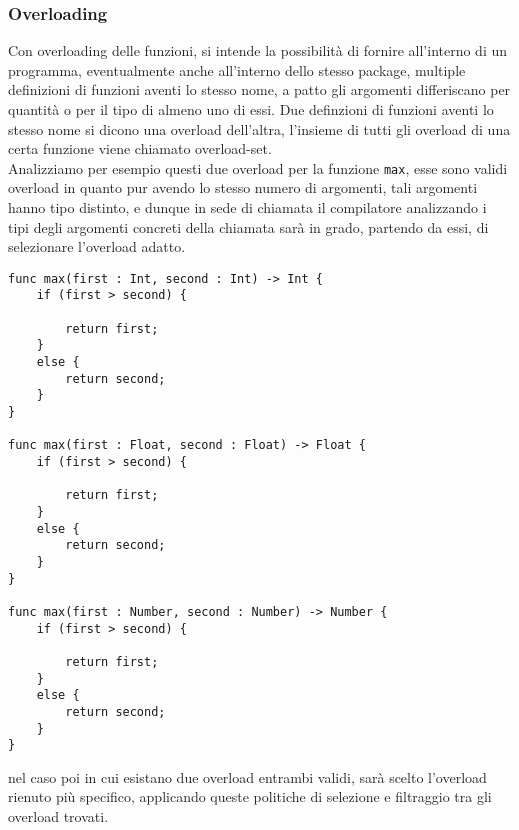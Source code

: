 \subsubsection{Overloading}
Con overloading delle funzioni, si intende la possibilità di fornire all’interno 
di un programma, eventualmente anche all’interno dello stesso package, multiple 
definizioni di funzioni aventi lo stesso nome, a patto gli argomenti differiscano 
per quantità o per il tipo di almeno uno di essi. Due definzioni di funzioni 
aventi lo stesso nome si dicono una overload dell’altra, l’insieme di tutti 
gli overload di una certa funzione viene chiamato overload-set. \\

Analizziamo per esempio questi due overload per la funzione \texttt{max}, esse sono 
validi overload in quanto pur avendo lo stesso numero di argomenti, tali 
argomenti hanno tipo distinto, e dunque in sede di chiamata il compilatore 
analizzando i tipi degli argomenti concreti della chiamata sarà in grado, 
partendo da essi, di selezionare l’overload adatto. \\

\vspace{0.5cm}
\begin{lstlisting}[frame=single]
func max(first : Int, second : Int) -> Int { 
    if (first > second) {

        return first; 
    }
    else {
        return second;
    }
}

func max(first : Float, second : Float) -> Float {
    if (first > second) {

        return first; 
    }
    else {
        return second;
    }
}

func max(first : Number, second : Number) -> Number {
    if (first > second) {

        return first; 
    }
    else {
        return second;
    }
}
\end{lstlisting}
\vspace{0.5cm}

\newpage

nel caso poi in cui esistano due overload entrambi validi, sarà scelto l’overload rienuto 
più specifico, applicando queste politiche di selezione e filtraggio tra gli overload trovati.

